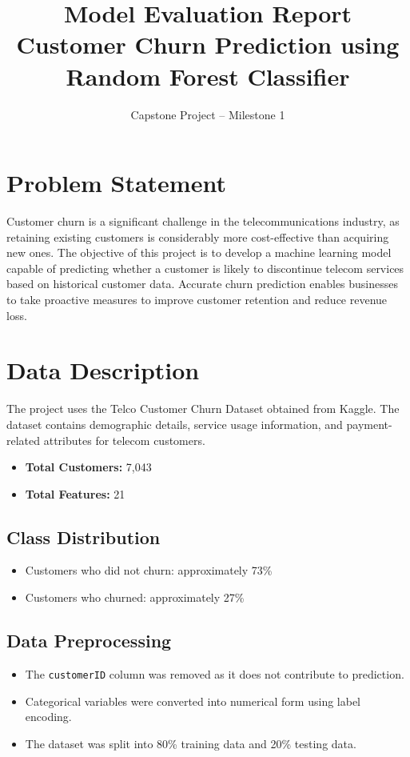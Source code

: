 \documentclass[12pt]{article}
\title{\textbf{Model Evaluation Report}\\
Customer Churn Prediction using Random Forest Classifier}
\author{Capstone Project -- Milestone 1}
\date{}
\begin{document}
\maketitle

\section{Problem Statement}

Customer churn is a significant challenge in the telecommunications industry, as retaining existing customers is considerably more cost-effective than acquiring new ones. The objective of this project is to develop a machine learning model capable of predicting whether a customer is likely to discontinue telecom services based on historical customer data. Accurate churn prediction enables businesses to take proactive measures to improve customer retention and reduce revenue loss.

\section{Data Description}

The project uses the Telco Customer Churn Dataset obtained from Kaggle. The dataset contains demographic details, service usage information, and payment-related attributes for telecom customers.

\begin{itemize}
    \item \textbf{Total Customers:} 7,043
    \item \textbf{Total Features:} 21
\end{itemize}

\subsection*{Class Distribution}
\begin{itemize}
    \item Customers who did not churn: approximately 73\%
    \item Customers who churned: approximately 27\%
\end{itemize}

\subsection*{Data Preprocessing}
\begin{itemize}
    \item The \texttt{customerID} column was removed as it does not contribute to prediction.
    \item Categorical variables were converted into numerical form using label encoding.
    \item The dataset was split into 80\% training data and 20\% testing data.
\end{itemize}
\end{document}
